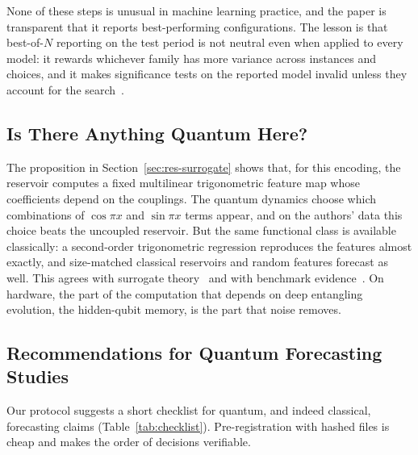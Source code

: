 \documentclass{ieeeaccess}
\begin{document}
None of these steps is unusual in machine learning practice, and the paper is transparent that it reports best-performing configurations. The lesson is that best-of-$N$ reporting on the test period is not neutral even when applied to every model: it rewards whichever family has more variance across instances and choices, and it makes significance tests on the reported model invalid unless they account for the search~\cite{white2000,hansen2005,bailey2014}.

\subsection{Is There Anything Quantum Here?}
The proposition in Section~\ref{sec:res-surrogate} shows that, for this encoding, the reservoir computes a fixed multilinear trigonometric feature map whose coefficients depend on the couplings. The quantum dynamics choose which combinations of $\cos\pi x$ and $\sin\pi x$ terms appear, and on the authors' data this choice beats the uncoupled reservoir. But the same functional class is available classically: a second-order trigonometric regression reproduces the features almost exactly, and size-matched classical reservoirs and random features forecast as well. This agrees with surrogate theory~\cite{schuld2021,schreiber2023,sweke2025} and with benchmark evidence~\cite{fellner2026}. On hardware, the part of the computation that depends on deep entangling evolution, the hidden-qubit memory, is the part that noise removes.

\subsection{Recommendations for Quantum Forecasting Studies}
Our protocol suggests a short checklist for quantum, and indeed classical, forecasting claims (Table~\ref{tab:checklist}). Pre-registration with hashed files is cheap and makes the order of decisions verifiable.
\end{document}
